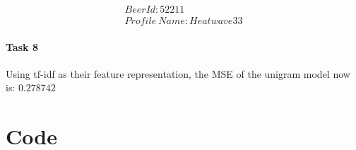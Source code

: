 \documentclass[a4paper,11pt]{article}
\theoremstyle{mytheor}
\begin{document}
\begin{align}
BeerId: 52211\\
Profile \ Name: Heatwave33
\end{align}

\paragraph{Task 8}
Using tf-idf as their feature representation, the MSE of the unigram model now is: $0.278742$


\clearpage

\section{Code}
\clearpage
\clearpage
\clearpage
\clearpage
\clearpage
\clearpage
\clearpage
\end{document}
